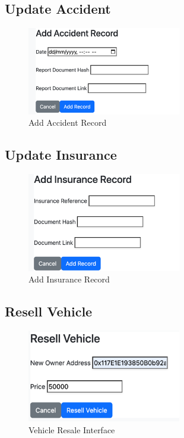 \documentclass[12pt,a4paper]{article}
\begin{document}
    \subsection{Update Accident}
    \begin{figure}[H]
        \centering
        \includegraphics[width=0.6\textwidth]{screenshots/vehicle - add accident record.png}
        \caption{Add Accident Record}
        \label{fig:update-accident}
    \end{figure}

    \subsection{Update Insurance}
    \begin{figure}[H]
        \centering
        \includegraphics[width=0.6\textwidth]{screenshots/vehicle - add insurance.png}
        \caption{Add Insurance Record}
        \label{fig:update-insurance}
    \end{figure}

    \subsection{Resell Vehicle}
    \begin{figure}[H]
        \centering
        \includegraphics[width=0.6\textwidth]{screenshots/resell vehicle.png}
        \caption{Vehicle Resale Interface}
        \label{fig:resell}
    \end{figure}
\end{document}
